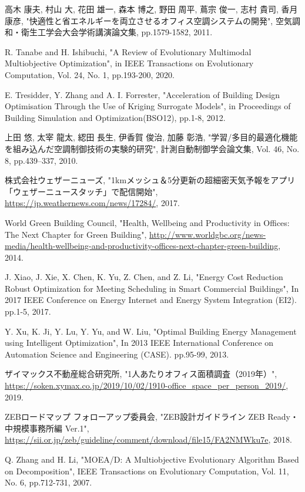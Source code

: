 \begin{thebibliography}{99}
     高木 康夫, 村山 大, 花田 雄一, 森本 博之, 野田 周平, 蔦宗 俊一, 志村 貴司, 香月 康彦, "快適性と省エネルギーを両立させるオフィス空調システムの開発", 空気調和・衛生工学会大会学術講演論文集, pp.1579-1582, 2011.

     R. Tanabe and H. Ishibuchi, "A Review of Evolutionary Multimodal Multiobjective Optimization",  in IEEE Transactions on Evolutionary Computation, Vol. 24, No. 1, pp.193-200, 2020.

     E. Tresidder, Y. Zhang and A. I. Forrester, "Acceleration of Building Design Optimisation Through the Use of Kriging Surrogate Models", in Proceedings of Building Simulation and Optimization(BSO12), pp.1-8, 2012.

     上田 悠, 太宰 龍太, 綛田 長生, 伊香賀 俊治, 加藤 彰浩, "学習/多目的最適化機能を組み込んだ空調制御技術の実験的研究", 計測自動制御学会論文集, Vol. 46, No. 8, pp.439–337, 2010.

     株式会社ウェザーニューズ, "1kmメッシュ＆5分更新の超細密天気予報をアプリ「ウェザーニュースタッチ」で配信開始", \url{https://jp.weathernews.com/news/17284/}, 2017.

     World Green Building Council, "Health, Wellbeing and Productivity in Offices: The Next Chapter for Green Building", \url{http://www.worldgbc.org/news-media/health-wellbeing-and-productivity-offices-next-chapter-green-building}, 2014.

     J. Xiao, J. Xie, X. Chen, K. Yu, Z. Chen, and Z. Li, "Energy Cost Reduction Robust Optimization for Meeting Scheduling in Smart Commercial Buildings", In 2017 IEEE Conference on Energy Internet and Energy System Integration (EI2). pp.1-5, 2017.

     Y. Xu, K. Ji, Y. Lu, Y. Yu, and W. Liu, "Optimal Building Energy Management using Intelligent Optimization", In 2013 IEEE International Conference on Automation Science and Engineering (CASE). pp.95-99, 2013.

     ザイマックス不動産総合研究所, "1人あたりオフィス面積調査（2019年）", \url{https://soken.xymax.co.jp/2019/10/02/1910-office_space_per_person_2019/}, 2019.

     ZEBロードマップ フォローアップ委員会, "ZEB設計ガイドライン ZEB Ready・中規模事務所編 Ver.1", \url{https://sii.or.jp/zeb/guideline/comment/download/file15/FA2NMWku7e}, 2018.

     Q. Zhang and H. Li, "MOEA/D: A Multiobjective Evolutionary Algorithm Based on Decomposition", IEEE Transactions on Evolutionary Computation, Vol. 11, No. 6, pp.712-731, 2007.


\end{thebibliography}
